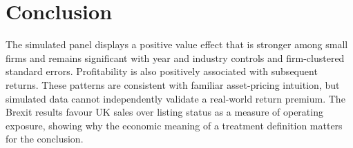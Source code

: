 \section*{Conclusion}

The simulated panel displays a positive value effect that is stronger among small firms and remains significant with year and industry controls and firm-clustered standard errors. Profitability is also positively associated with subsequent returns. These patterns are consistent with familiar asset-pricing intuition, but simulated data cannot independently validate a real-world return premium. The Brexit results favour UK sales over listing status as a measure of operating exposure, showing why the economic meaning of a treatment definition matters for the conclusion.
